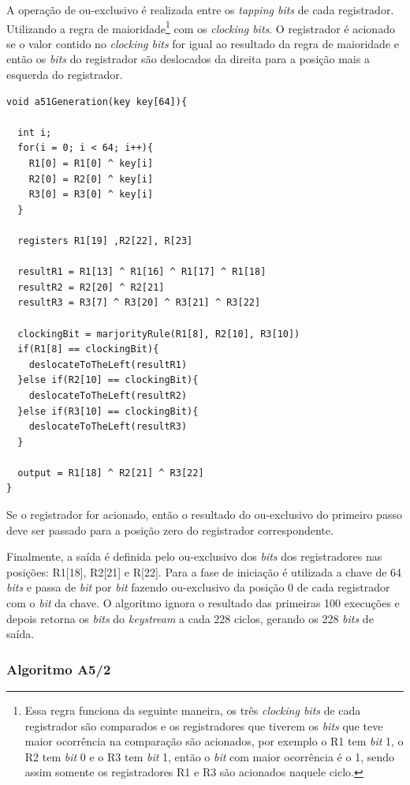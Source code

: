 A operação de ou-exclusivo é realizada entre os \textit{tapping bits} de cada registrador. Utilizando a regra de maioridade\footnote{Essa regra funciona da seguinte maneira, os três \textit{clocking bits} de cada registrador são comparados e os registradores que tiverem os \textit{bits} que teve maior ocorrência na comparação são acionados, por exemplo o R1 tem \textit{bit} 1, o R2 tem \textit{bit} 0 e o R3 tem \textit{bit} 1, então o \textit{bit} com maior ocorrência é o 1, sendo assim somente os registradores R1 e R3 são acionados naquele ciclo.} com os \textit{clocking bits}. O registrador é acionado se o valor contido no \textit{clocking bits} for igual ao resultado da regra de maioridade e então os \textit{bits} do registrador são deslocados da direita para a posição mais a esquerda do registrador.

\begin{lstlisting}[caption={Pseudo-código A5/1}, label=a51-pseudo-code]
void a51Generation(key key[64]){

  int i;
  for(i = 0; i < 64; i++){
  	R1[0] = R1[0] ^ key[i]
	R2[0] = R2[0] ^ key[i]
	R3[0] = R3[0] ^ key[i]  
  }

  registers R1[19] ,R2[22], R[23]
  
  resultR1 = R1[13] ^ R1[16] ^ R1[17] ^ R1[18]
  resultR2 = R2[20] ^ R2[21]
  resultR3 = R3[7] ^ R3[20] ^ R3[21] ^ R3[22]
  
  clockingBit = marjorityRule(R1[8], R2[10], R3[10])
  if(R1[8] == clockingBit){
  	deslocateToTheLeft(resultR1)
  }else if(R2[10] == clockingBit){
    deslocateToTheLeft(resultR2)
  }else if(R3[10] == clockingBit){
    deslocateToTheLeft(resultR3)
  }
  
  output = R1[18] ^ R2[21] ^ R3[22]
}
    \end{lstlisting}

Se o registrador for acionado, então o resultado do ou-exclusivo do primeiro passo deve ser passado para a posição zero do registrador correspondente.

Finalmente, a saída é definida pelo ou-exclusivo dos \textit{bits} dos registradores nas posições: R1[18], R2[21] e R[22]. Para a fase de iniciação é utilizada a chave de 64 \textit{bits} e passa de \textit{bit} por \textit{bit} fazendo ou-exclusivo da posição 0 de cada registrador com o \textit{bit} da chave. O algoritmo ignora o resultado das primeiras 100 execuções e depois retorna os \textit{bits} do \textit{keystream} a cada 228 ciclos, gerando os 228 \textit{bits} de saída.

\subsubsection{Algoritmo A5/2}
\label{algorithm-a52}

